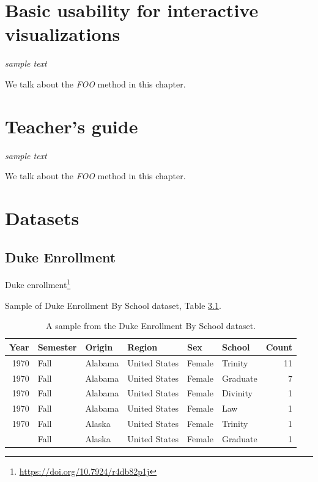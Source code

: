 \documentclass[
]{krantz}
\renewcommand{\href}[2]{#2\footnote{\url{#1}}}
\begin{document}
\hypertarget{usability-for-visualizations}{%
\chapter{Basic usability for interactive visualizations}\label{usability-for-visualizations}}

\emph{sample text}

We talk about the \emph{FOO} method in this chapter.

\hypertarget{teachers-guide}{%
\chapter{Teacher's guide}\label{teachers-guide}}

\emph{sample text}

We talk about the \emph{FOO} method in this chapter.

\cleardoublepage

\hypertarget{appendix-appendix}{%
\appendix {}}


\hypertarget{datasets}{%
\chapter{Datasets}\label{datasets}}

\hypertarget{duke-enrollment}{%
\section*{Duke Enrollment}\label{duke-enrollment}}


\href{https://doi.org/10.7924/r4db82p1j}{Duke enrollment}

Sample of Duke Enrollment By School dataset, Table \ref{tab:duke-school-tab}.

\begin{table}

\caption{\label{tab:duke-school-tab}A sample from the Duke Enrollment By School dataset.}
\centering
\begin{tabular}[t]{rlllllr}
\toprule
Year & Semester & Origin & Region & Sex & School & Count\\
\midrule
1970 & Fall & Alabama & United States & Female & Trinity & 11\\
1970 & Fall & Alabama & United States & Female & Graduate & 7\\
1970 & Fall & Alabama & United States & Female & Divinity & 1\\
1970 & Fall & Alabama & United States & Female & Law & 1\\
1970 & Fall & Alaska & United States & Female & Trinity & 1\\
\addlinespace
1970 & Fall & Alaska & United States & Female & Graduate & 1\\
\bottomrule
\end{tabular}
\end{table}
\end{document}
